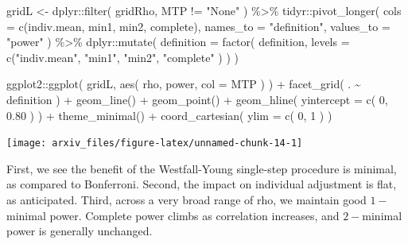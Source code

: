 \documentclass{article}
\newenvironment{Shaded}{\begin{snugshade}}{\end{snugshade}}
\newcommand{\AttributeTok}[1]{\textcolor[rgb]{0.77,0.63,0.00}{#1}}
\newcommand{\DecValTok}[1]{\textcolor[rgb]{0.00,0.00,0.81}{#1}}
\newcommand{\FloatTok}[1]{\textcolor[rgb]{0.00,0.00,0.81}{#1}}
\newcommand{\FunctionTok}[1]{\textcolor[rgb]{0.00,0.00,0.00}{#1}}
\newcommand{\NormalTok}[1]{#1}
\newcommand{\OtherTok}[1]{\textcolor[rgb]{0.56,0.35,0.01}{#1}}
\newcommand{\SpecialCharTok}[1]{\textcolor[rgb]{0.00,0.00,0.00}{#1}}
\newcommand{\StringTok}[1]{\textcolor[rgb]{0.31,0.60,0.02}{#1}}
\begin{document}
\begin{Shaded}
\begin{Highlighting}[]
\NormalTok{gridL }\OtherTok{\textless{}{-}}\NormalTok{ dplyr}\SpecialCharTok{::}\FunctionTok{filter}\NormalTok{( gridRho, MTP }\SpecialCharTok{!=} \StringTok{"None"}\NormalTok{ ) }\SpecialCharTok{\%\textgreater{}\%}
\NormalTok{  tidyr}\SpecialCharTok{::}\FunctionTok{pivot\_longer}\NormalTok{( }\AttributeTok{cols =} \FunctionTok{c}\NormalTok{(indiv.mean, min1, min2, complete),}
                         \AttributeTok{names\_to =} \StringTok{"definition"}\NormalTok{, }\AttributeTok{values\_to =} \StringTok{"power"}\NormalTok{ ) }\SpecialCharTok{\%\textgreater{}\%}
\NormalTok{  dplyr}\SpecialCharTok{::}\FunctionTok{mutate}\NormalTok{( }\AttributeTok{definition =} \FunctionTok{factor}\NormalTok{( definition,}
          \AttributeTok{levels =} \FunctionTok{c}\NormalTok{(}\StringTok{"indiv.mean"}\NormalTok{, }\StringTok{"min1"}\NormalTok{, }\StringTok{"min2"}\NormalTok{, }\StringTok{"complete"}\NormalTok{ ) ) )}

\NormalTok{ggplot2}\SpecialCharTok{::}\FunctionTok{ggplot}\NormalTok{( gridL, }\FunctionTok{aes}\NormalTok{( rho, power, }\AttributeTok{col =}\NormalTok{ MTP ) ) }\SpecialCharTok{+}
  \FunctionTok{facet\_grid}\NormalTok{( . }\SpecialCharTok{\textasciitilde{}}\NormalTok{ definition ) }\SpecialCharTok{+}
  \FunctionTok{geom\_line}\NormalTok{() }\SpecialCharTok{+} \FunctionTok{geom\_point}\NormalTok{() }\SpecialCharTok{+}
  \FunctionTok{geom\_hline}\NormalTok{( }\AttributeTok{yintercept =} \FunctionTok{c}\NormalTok{( }\DecValTok{0}\NormalTok{, }\FloatTok{0.80}\NormalTok{ ) ) }\SpecialCharTok{+} 
  \FunctionTok{theme\_minimal}\NormalTok{() }\SpecialCharTok{+}
  \FunctionTok{coord\_cartesian}\NormalTok{( }\AttributeTok{ylim =} \FunctionTok{c}\NormalTok{( }\DecValTok{0}\NormalTok{, }\DecValTok{1}\NormalTok{ ) )}
\end{Highlighting}
\end{Shaded}

\begin{center}\texttt{[image: arxiv\_files/figure-latex/unnamed-chunk-14-1]} \end{center}

First, we see the benefit of the Westfall-Young single-step procedure is
minimal, as compared to Bonferroni. Second, the impact on individual
adjustment is flat, as anticipated. Third, across a very broad range of
rho, we maintain good \(1-\)minimal power. Complete power climbs as
correlation increases, and \(2-\)minimal power is generally unchanged.
\end{document}
